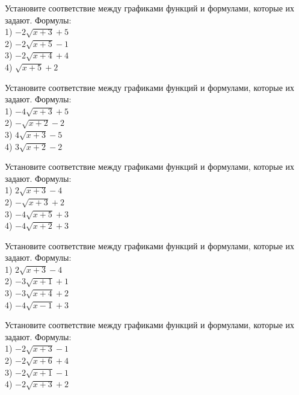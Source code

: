\documentclass[4apaper]{article}
\begin{document}
\begin{taskBN}{1}
Установите соответствие между графиками функций и формулами, которые их задают. Формулы: \\1) $-2\sqrt{x+3}+5$\\2) $-2\sqrt{x+5}-1$\\3) $-2\sqrt{x+4}+4$\\4) $\sqrt{x+5}+2$
\end{taskBN}

\begin{taskBN}{2}
Установите соответствие между графиками функций и формулами, которые их задают. Формулы: \\1) $-4\sqrt{x+3}+5$\\2) $-\sqrt{x+2}-2$\\3) $4\sqrt{x+3}-5$\\4) $3\sqrt{x+2}-2$
\end{taskBN}

\begin{taskBN}{3}
Установите соответствие между графиками функций и формулами, которые их задают. Формулы: \\1) $2\sqrt{x+3}-4$\\2) $-\sqrt{x+3}+2$\\3) $-4\sqrt{x+5}+3$\\4) $-4\sqrt{x+2}+3$
\end{taskBN}

\begin{taskBN}{4}
Установите соответствие между графиками функций и формулами, которые их задают. Формулы: \\1) $2\sqrt{x+3}-4$\\2) $-3\sqrt{x+1}+1$\\3) $-3\sqrt{x+4}+2$\\4) $-4\sqrt{x-1}+3$
\end{taskBN}

\begin{taskBN}{5}
Установите соответствие между графиками функций и формулами, которые их задают. Формулы: \\1) $-2\sqrt{x+3}-1$\\2) $-2\sqrt{x+6}+4$\\3) $-2\sqrt{x+1}-1$\\4) $-2\sqrt{x+3}+2$
\end{taskBN}
\end{document}
